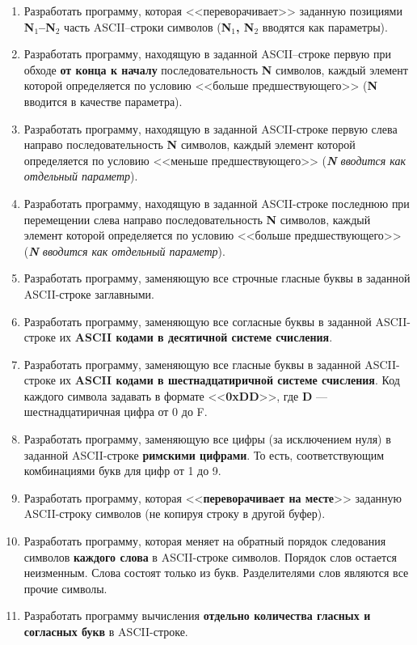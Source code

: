 \documentclass[a4paper, 12pt, oneside]{article}
\begin{document}
\begin{enumerate}
    \item Разработать программу, которая <<переворачивает>> заданную позициями \textbf{N$_1$--N$_2$} часть ASCII--строки символов (\textbf{N$_1$, N$_2$} вводятся как параметры).
    \item Разработать программу, находящую в заданной ASCII--строке первую  при обходе \textbf{от конца к началу} последовательность \textbf{N} символов, каждый элемент которой определяется по условию <<больше предшествующего>> (\textbf{N} вводится в качестве параметра).
    \item Разработать программу, находящую в заданной ASCII-строке первую слева направо последовательность \textbf{N} символов, каждый элемент которой определяется по условию <<меньше предшествующего>> (\textit{\textbf{N} вводится как отдельный параметр}).
    \item Разработать программу, находящую в заданной ASCII-строке последнюю при перемещении слева направо последовательность \textbf{N} символов, каждый элемент которой определяется по условию <<больше предшествующего>> (\textit{\textbf{N} вводится как отдельный параметр}).
    \item Разработать программу, заменяющую все строчные гласные буквы в заданной ASCII-строке заглавными.
    \item Разработать программу, заменяющую все согласные буквы в заданной ASCII-строке их \textbf{ASCII кодами в десятичной системе счисления}.
    \item Разработать программу, заменяющую все гласные буквы в заданной ASCII-строке их \textbf{ASCII кодами в шестнадцатиричной системе счисления}. Код каждого символа задавать в формате <<\textbf{0xDD}>>, где \textbf{D} --- шестнадцатиричная цифра от 0 до F.
    \item Разработать программу, заменяющую все цифры (за исключением нуля) в заданной ASCII-строке \textbf{римскими цифрами}. То есть, соответствующим комбинациями букв для цифр от 1 до 9.
    \item Разработать программу, которая <<\textbf{переворачивает на месте}>> заданную ASCII-строку символов (не копируя строку в другой буфер).
    \item Разработать программу, которая меняет на обратный порядок следования символов \textbf{каждого слова} в ASCII-строке символов. Порядок слов остается неизменным. Слова состоят только из букв. Разделителями слов являются все прочие символы.
    \item Разработать программу вычисления \textbf{отдельно количества гласных и согласных букв} в ASCII-строке.

\end{enumerate}
\end{document}
